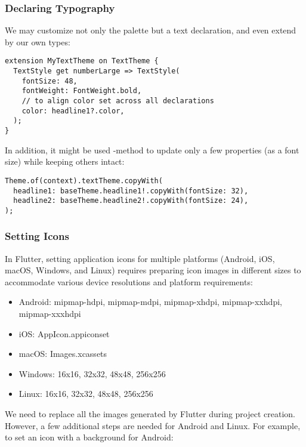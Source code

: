 \subsubsection{Declaring Typography}

We may customize not only the palette but a text declaration, and even extend  by our own types:

\begin{lstlisting}
extension MyTextTheme on TextTheme {
  TextStyle get numberLarge => TextStyle(
    fontSize: 48,
    fontWeight: FontWeight.bold,
    // to align color set across all declarations
    color: headline1?.color,
  );
}
\end{lstlisting}

\noindent In addition, it might be used -method to update only a few properties (as a font size) while 
keeping others intact: 
\newpage
\begin{lstlisting}
Theme.of(context).textTheme.copyWith(
  headline1: baseTheme.headline1!.copyWith(fontSize: 32),
  headline2: baseTheme.headline2!.copyWith(fontSize: 24),
);
\end{lstlisting}


\subsubsection{Setting Icons}

In Flutter, setting application icons for multiple platforms (Android, iOS, macOS, Windows, and Linux) requires 
preparing icon images in different sizes to accommodate various device resolutions and platform requirements:

\begin{itemize}
  \item Android: mipmap-hdpi, mipmap-mdpi, mipmap-xhdpi, mipmap-xxhdpi, mipmap-xxxhdpi
  \item iOS: AppIcon.appiconset
  \item macOS: Images.xcassets
  \item Windows: 16x16, 32x32, 48x48, 256x256
  \item Linux: 16x16, 32x32, 48x48, 256x256
\end{itemize}

\noindent We need to replace all the images generated by Flutter during project creation. However, a few additional 
steps are needed for Android and Linux. For example, to set an icon with a background for Android:

